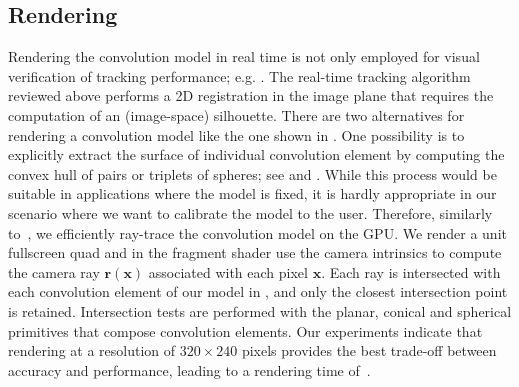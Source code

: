 

\subsection{Rendering}
\label{sec:rendering}
Rendering the convolution model in real time is not only employed for visual verification of tracking performance; e.g. . The real-time tracking algorithm reviewed above performs a 2D registration in the image plane that requires the computation of an (image-space) silhouette. There are two alternatives for rendering a  convolution model like the one shown in . One possibility is to explicitly extract the surface of individual convolution element by computing the convex hull of pairs or triplets of spheres; see  and \cite{ando2013liquid}. While this process would be suitable in applications where the model is fixed, it is hardly appropriate in our scenario where we want to calibrate the model to the user. Therefore, similarly to~\cite{thiery2016spheremesh}, we efficiently ray-trace the convolution model on the GPU. We render a unit fullscreen quad and in the fragment shader use the camera intrinsics to compute the camera ray $\mathbf{r}(\mathbf{x})$ associated with each pixel $\mathbf{x}$. Each ray is intersected with each convolution element of our model in , and only the closest intersection point is retained. Intersection tests are performed with the planar, conical and spherical primitives that compose convolution elements. 
% 
% 
Our experiments indicate that rendering at a resolution of $320 \times 240$ pixels provides the best trade-off between accuracy and performance, leading to a rendering time of~.




\endinput


